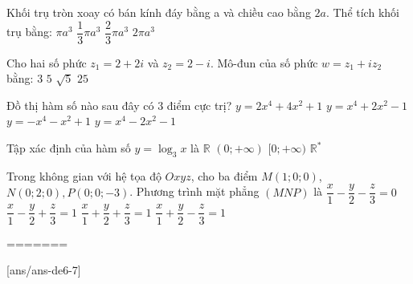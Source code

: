 \begin{ex}%
Khối trụ tròn xoay có bán kính đáy bằng a và chiều cao bằng $2{a}$. Thể tích khối trụ bằng:
\choice
{$\pi a^3$}
{$\dfrac{1}{3} \pi a^3$}
{$\dfrac{2}{3} \pi a^3$}
{\True $2\pi a^3$}

\end{ex}
\begin{ex}%
Cho hai số phức $z_1=2+2 i$ và $z_2=2-i$. Mô-đun của số phức $w=z_1+i z_2$ bằng:
\choice
{$3$}
{\True $5$}
{$\sqrt{5}$}
{$25$}

\end{ex}
\begin{ex}%
Đồ thị hàm số nào sau đây có $3$ điểm cực trị?
\choice
{$y=2 x^4+4 x^2+1$}
{$y=x^4+2 x^2-1$}
{$y=-x^4-x^2+1$}
{\True $y=x^4-2 x^2-1$}

\end{ex}
\begin{ex}%
Tập xác định của hàm số $y=\log_3 x$ là
\choice
{$\mathbb{R}$}
{\True $(0;+\infty)$}
{$[0;+\infty)$}
{$\mathbb{R}^{*}$}

\end{ex}
\begin{ex}%
Trong không gian với hệ tọa độ $O x y z$, cho ba điểm $M(1; 0; 0)$, $N(0; 2; 0), P(0; 0;-3)$. Phương trình mặt phẳng $(MNP)$ là
\choice
{$\dfrac{x}{1}-\dfrac{y}{2}-\dfrac{z}{3}=0$}
{$\dfrac{x}{1}-\dfrac{y}{2}+\dfrac{z}{3}=1$}
{$\dfrac{x}{1}+\dfrac{y}{2}+\dfrac{z}{3}=1$}
{\True $\dfrac{x}{1}+\dfrac{y}{2}-\dfrac{z}{3}=1$}

\end{ex}


=======

\begin{name}
	{\tenchude}
	{\tendethi}
	{\tentruong}
	{\thoigian}
\end{name}
[ans/ans-de6-7]

